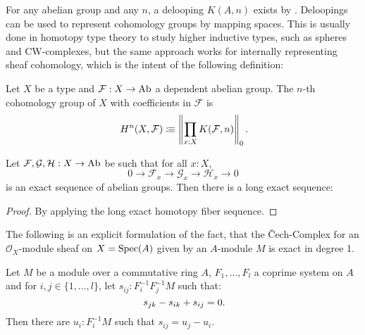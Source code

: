 For any abelian group and any $n$, a delooping $K(A,n)$ exists by \cite{licata-finster}.
Deloopings can be used to represent cohomology groups by mapping spaces.
This is usually done in homotopy type theory to study higher inductive types, such as spheres and CW-complexes,
but the same approach works for internally representing sheaf cohomology,
which is the intent of the following definition:

\begin{definition}
  \label{cohomology}
  Let $X$ be a type and $\mathcal F:X\to\operatorname{Ab}$ a dependent abelian group.
  The $n$-th cohomology group of $X$ with coefficients in $\mathcal F$ is
  \[
    H^n(X,\mathcal F)\colonequiv \left\propTrunc{\prod_{x:X}K(\mathcal F,n)\right}_0\rlap{.}
  \]
\end{definition}

\begin{theorem}%
  \label{cohomology-les}
  Let $\mathcal F,\mathcal G,\mathcal H:X\to \operatorname{Ab}$ be such that for all $x:X$,
  \[
    0\to \mathcal F_x\to\mathcal G_x\to\mathcal H_x\to 0
  \]
  is an exact sequence of abelian groups. Then there is a long exact sequence:
  \begin{center}
  \end{center}
\end{theorem}

\begin{proof}
  By applying the long exact homotopy fiber sequence.
\end{proof}

The following is an explicit formulation of the fact, that the Čech-Complex for an
$\mathcal{O}_X$-module sheaf on $X=\operatorname{Spec}(A)$ given by an $A$-module $M$ is exact in degree 1.
\begin{lemma}%
  \label{H1-algebra}
  Let $M$ be a module over a commutative ring $A$, $F_1,\dots,F_l$ a coprime system on $A$
  and for $i,j\in\{1,\dots,l\}$, let $s_{ij} : F_i^{-1} F_j^{-1} M$ such that:
  \[ s_{jk}-s_{ik}+s_{ij}=0 \rlap{.}\]
  Then there are $u_i:F_i^{-1}M$ such that $s_{ij}=u_j - u_i$.
\end{lemma}

